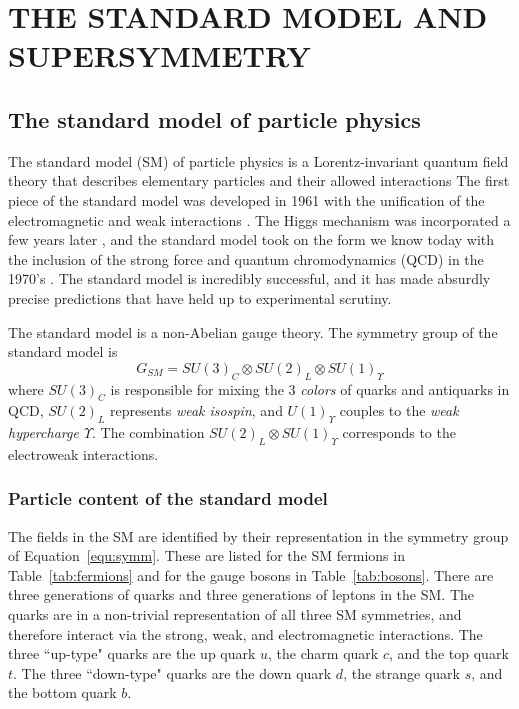 \chapter{THE STANDARD MODEL AND SUPERSYMMETRY}
\label{chap:theory}

\section{The standard model of particle physics}
\label{sec:StandardModel}
The standard model (SM) of particle physics is a Lorentz-invariant quantum field theory that describes elementary particles and their allowed interactions
The first piece of the standard model was developed in 1961 with the unification of the electromagnetic and weak interactions 
\cite{GLASHOW1961579,Glashow:1970gm}. 
The Higgs mechanism was incorporated a few years later 
\cite{PhysRev.127.965,PhysRevLett.13.508,PhysRevLett.13.321,Guralnik:1964eu}, and 
the standard model took on the form we know today with the inclusion of the strong force and quantum chromodynamics (QCD) in the 1970's \cite{PhysRevLett.19.1264}.
The standard model is incredibly successful, and it has made absurdly precise predictions that have held up to experimental scrutiny. 

The standard model is a non-Abelian gauge theory. The symmetry group of the standard model is 
\begin{equation}
G_{SM} = SU(3)_C \otimes SU(2)_L \otimes SU(1)_\Upsilon
\label{equ:symm}
\end{equation}
where $SU(3)_C$ is responsible for mixing the 3 \textit{colors} of quarks and antiquarks in QCD, $SU(2)_L$ represents \textit{weak isospin}, and $U(1)_\Upsilon$ couples to the \textit{weak hypercharge $\Upsilon$}. The combination $SU(2)_L \otimes SU(1)_\Upsilon$ corresponds to the electroweak interactions. 

\subsection{Particle content of the standard model}
\label{sec:SMparts}
The fields in the SM are identified by their representation in the symmetry group of Equation~\ref{equ:symm}. These are listed for the SM fermions in Table~\ref{tab:fermions} and for the gauge bosons in Table~\ref{tab:bosons}. There are three generations of quarks and three generations of leptons in the SM. The quarks are in a non-trivial representation of all three SM symmetries, and therefore interact via the strong, weak, and electromagnetic interactions. The three ``up-type" quarks are the up quark $u$, the charm quark $c$, and the top quark $t$. The three ``down-type" quarks are the down quark $d$, the strange quark $s$, and the bottom quark $b$. 


